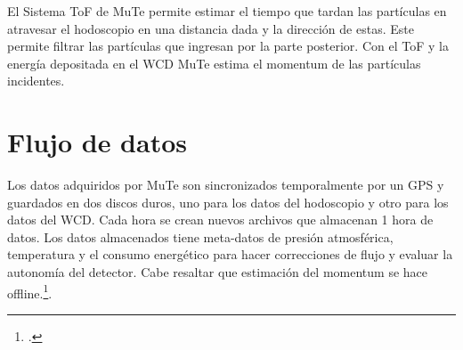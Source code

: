 El Sistema ToF de MuTe permite estimar el tiempo que tardan las partículas en atravesar el hodoscopio en una distancia dada y la dirección de estas. Este permite filtrar las partículas que ingresan por la parte posterior. Con el ToF y la energía depositada en el WCD MuTe estima el momentum de las partículas incidentes.

\section{Flujo de datos}

Los datos adquiridos por MuTe son sincronizados temporalmente por un GPS y guardados en dos discos duros, uno para los datos del hodoscopio y otro para los datos del WCD. Cada hora se crean nuevos archivos que almacenan 1 hora de datos. Los datos almacenados tiene meta-datos de presión atmosférica, temperatura y el consumo energético para hacer correcciones de flujo y evaluar la autonomía del detector. Cabe resaltar que estimación del momentum se hace offline.\footcite{jesusP}.
